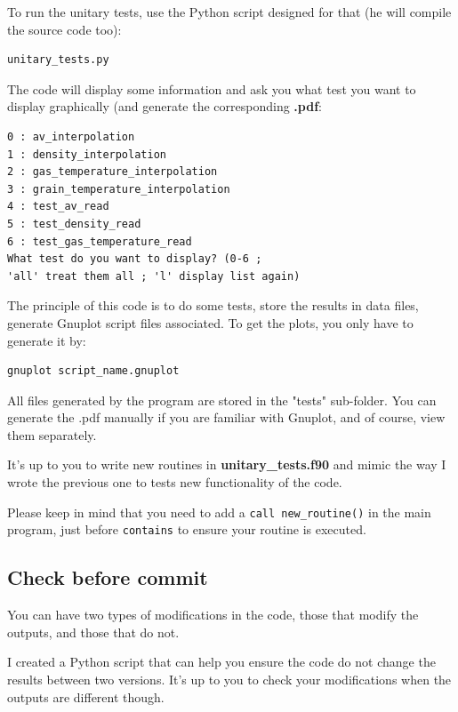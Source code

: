 \documentclass[english,a4paper,twoside]{article}
\begin{document}
To run the unitary tests, use the Python script designed for that (he will compile the source code too): 
\begin{verbatim}
unitary_tests.py
\end{verbatim}

The code will display some information and ask you what test you want to display graphically (and generate the corresponding \textbf{.pdf}:
\begin{verbatim}
0 : av_interpolation
1 : density_interpolation
2 : gas_temperature_interpolation
3 : grain_temperature_interpolation
4 : test_av_read
5 : test_density_read
6 : test_gas_temperature_read
What test do you want to display? (0-6 ; 
'all' treat them all ; 'l' display list again)
\end{verbatim}

The principle of this code is to do some tests, store the results in data files, generate Gnuplot script files associated. To get the plots, you only have to generate it by:
\begin{verbatim}
gnuplot script_name.gnuplot
\end{verbatim}

All files generated by the program are stored in the "tests" sub-folder. You can generate the .pdf manually if you are familiar with Gnuplot, and of course, view them separately.

\begin{remarque}
It's up to you to write new routines in \textbf{unitary\_tests.f90} and mimic the way I wrote the previous one to tests new functionality of the code.

Please keep in mind that you need to add a \verb|call new_routine()| in the main program, just before \verb|contains| to ensure your routine is executed.
\end{remarque}

\subsection{Check before commit}\label{sec:compare_simulation}
You can have two types of modifications in the code, those that modify the outputs, and those that do not.

I created a Python script  that can help you ensure the code do not change the results between two versions. It's up to you to check your modifications when the outputs are different though.

\bigskip
\end{document}
